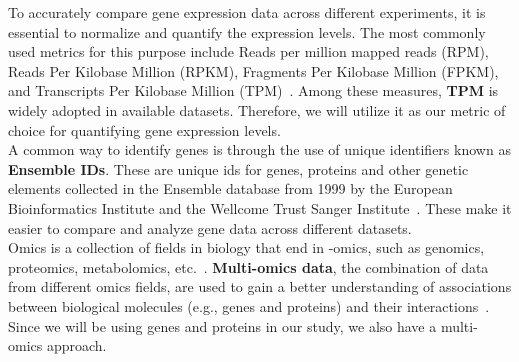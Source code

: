 To accurately compare gene expression data across different experiments, it is essential to normalize and quantify the expression levels.
The most commonly used metrics for this purpose include Reads per million mapped reads (RPM),
Reads Per Kilobase Million (RPKM), Fragments Per Kilobase Million (FPKM),
and Transcripts Per Kilobase Million (TPM)~\cite{cd_geneomics_gene_expression}.
Among these measures, \textbf{TPM} is widely adopted in available datasets.
Therefore, we will utilize it as our metric of choice for quantifying gene expression levels.
\\

A common way to identify genes is through the use of unique identifiers known as \textbf{Ensemble IDs}.
These are unique ids for genes, proteins and other genetic elements collected in the Ensemble database
from 1999 by the European Bioinformatics Institute and the Wellcome Trust Sanger Institute~\cite{ensembl_project}.
These make it easier to compare and analyze gene data across different datasets.
\\

Omics is a collection of fields in biology that end in -omics, such as genomics, proteomics, metabolomics, etc.~\cite{subedi2022omics}.
\textbf{Multi-omics data}, the combination of data from different omics fields,
are used to gain a better understanding of associations between biological molecules (e.g., genes and proteins)
and their interactions~\cite{Subramanian2020MultiomicsDI}.
Since we will be using genes and proteins in our study, we also have a multi-omics approach.
\\